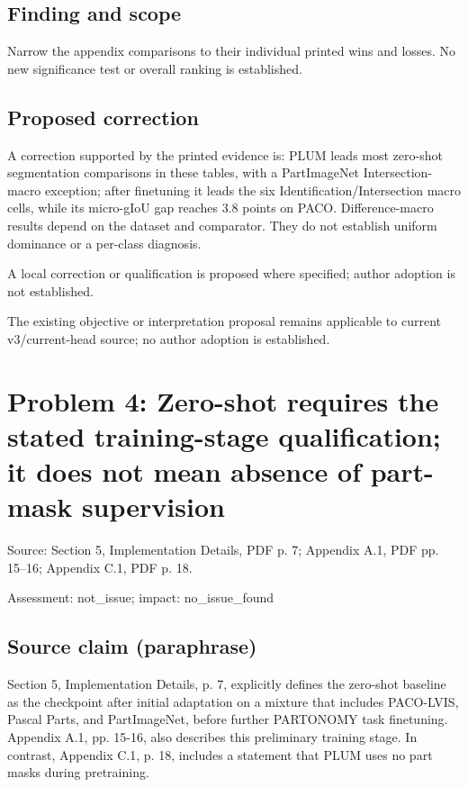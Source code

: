 \documentclass[11pt]{article}
\begin{document}
\subsection*{Finding and scope}

Narrow the appendix comparisons to their individual printed wins and losses. No new significance test or overall ranking is established.

\subsection*{Proposed correction}

A correction supported by the printed evidence is: PLUM leads most zero-shot segmentation comparisons in these tables, with a PartImageNet Intersection-macro exception; after finetuning it leads the six Identification/Intersection macro cells, while its micro-gIoU gap reaches \(3.8\) points on PACO. Difference-macro results depend on the dataset and comparator. They do not establish uniform dominance or a per-class diagnosis.

A local correction or qualification is proposed where specified; author adoption is not established.

The existing objective or interpretation proposal remains applicable to current v3/current-head source; no author adoption is established.

\section*{Problem 4: Zero-shot requires the stated training-stage qualification; it does not mean absence of part-mask supervision}

Source: Section 5, Implementation Details, PDF p. 7; Appendix A.1, PDF pp. 15–16; Appendix C.1, PDF p. 18.

Assessment: not\_issue; impact: no\_issue\_found

\subsection*{Source claim (paraphrase)}

Section 5, Implementation Details, p. 7, explicitly defines the zero-shot baseline as the checkpoint after initial adaptation on a mixture that includes PACO-LVIS, Pascal Parts, and PartImageNet, before further PARTONOMY task finetuning. Appendix A.1, pp. 15-16, also describes this preliminary training stage. In contrast, Appendix C.1, p. 18, includes a statement that PLUM uses no part masks during pretraining.
\end{document}
